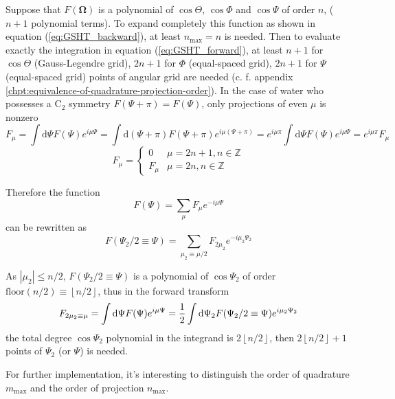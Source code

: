 Suppose that $F(\mathbf{\Omega})$ is a polynomial of $\cos\Theta$,
$\cos\Phi$ and $\cos\Psi$ of order $n$, ($n+1$ polynomial terms).
To expand completely this function as shown in equation (\ref{eq:GSHT_backward}),
at least $n_{\mathrm{max}}=n$ is needed. Then to evaluate exactly
the integration in equation (\ref{eq:GSHT_forward}), at least $n+1$
for $\cos\Theta$ (Gauss-Legendre grid), $2n+1$ for $\Phi$ (equal-spaced
grid), $2n+1$ for $\Psi$ (equal-spaced grid) points of angular grid
are needed (c. f. appendix \ref{chpt:equivalence-of-quadrature-projection-order}).
In the case of water who possesses a $\mathrm{C}_{2}$ symmetry $F(\Psi+\pi)=F(\Psi)$,
only projections of even $\mu$ is nonzero
\begin{equation}
F_{\mu}=\int\mathrm{d}\Psi F(\Psi)e^{i\mu\Psi}=\int\mathrm{d}(\Psi+\pi)F(\Psi+\pi)e^{i\mu(\Psi+\pi)}=e^{i\mu\pi}\int\mathrm{d}\Psi F(\Psi)e^{i\mu\Psi}=e^{i\mu\pi}F_{\mu}
\end{equation}
\begin{equation}
F_{\mu}=\begin{cases}
0 & \mu=2n+1,n\in\mathbb{Z}\\
F_{\mu} & \mu=2n,n\in\mathbb{Z}
\end{cases}
\end{equation}


Therefore the function
\begin{equation}
F(\Psi)=\sum_{\mu}F_{\mu}e^{-i\mu\Psi}
\end{equation}
can be rewritten as
\begin{equation}
F(\Psi_{2}/2\equiv\Psi)=\sum_{\mu_{2}\equiv\mu/2}F_{2\mu_{2}}e^{-i\mu_{2}\Psi_{2}}
\end{equation}


As $\left|\mu_{2}\right|\leq n/2$, $F(\Psi_{2}/2\equiv\Psi)$ is
a polynomial of $\cos\Psi_{2}$ of order $\mathrm{floor}(n/2)\equiv\left\lfloor n/2\right\rfloor $,
thus in the forward transform
\begin{equation}
F_{2\mu_{2}\equiv\mu}=\intop\mathrm{d}\Psi F(\Psi)e^{i\mu\Psi}=\frac{1}{2}\intop\mathrm{d}\Psi_{2}F(\Psi_{2}/2\equiv\Psi)e^{i\mu_{2}\Psi_{2}}
\end{equation}
the total degree $\cos\Psi_{2}$ polynomial in the integrand is $2\left\lfloor n/2\right\rfloor $,
then $2\left\lfloor n/2\right\rfloor +1$ points of $\Psi_{2}$ (or
$\Psi$) is needed. 

For further implementation, it's interesting to distinguish the order
of quadrature $m_{\mathrm{max}}$ and the order of projection $n_{\mathrm{max}}$.


